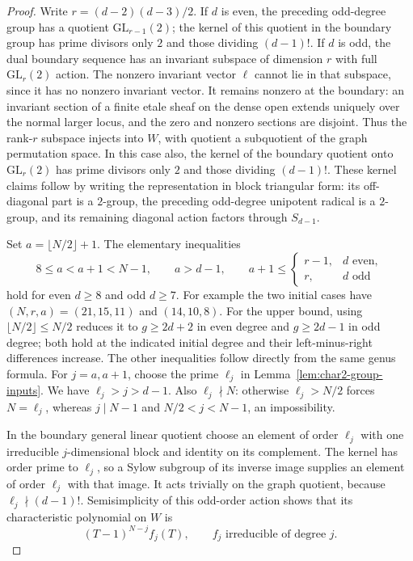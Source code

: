 \begin{proof}
Write $r=(d-2)(d-3)/2$. If $d$ is even, the preceding odd-degree
group has a quotient $\mathrm{GL}_{r-1}(2)$; the kernel of this
quotient in the boundary group has prime divisors only $2$ and
those dividing $(d-1)!$. If $d$ is odd, the dual boundary
sequence has an invariant subspace of dimension $r$ with full
$\mathrm{GL}_r(2)$ action. The nonzero invariant vector $\ell$
cannot lie in that subspace, since it has no nonzero invariant
vector. It remains nonzero at the boundary: an invariant section
of a finite etale sheaf on the dense open extends uniquely over
the normal larger locus, and the zero and nonzero sections are
disjoint. Thus the rank-$r$ subspace injects into $W$, with quotient
a subquotient of the graph permutation space. In this case also,
the kernel of the boundary quotient onto $\mathrm{GL}_r(2)$ has
prime divisors only $2$ and those dividing $(d-1)!$. These kernel
claims follow by writing the representation in block triangular
form: its off-diagonal part is a $2$-group, the preceding odd-degree
unipotent radical is a $2$-group, and its remaining diagonal
action factors through $S_{d-1}$.

Set $a=\lfloor N/2\rfloor+1$. The elementary inequalities
\[
 8\le a<a+1<N-1,\qquad a>d-1,\qquad
 a+1\le\begin{cases}r-1,&d\text{ even},\\r,&d\text{ odd}
 \end{cases}
\]
hold for even $d\ge8$ and odd $d\ge7$. For example the two initial
cases have $(N,r,a)=(21,15,11)$ and $(14,10,8)$.
For the upper bound, using $\lfloor N/2\rfloor\le N/2$
reduces it to $g\ge2d+2$ in even degree and $g\ge2d-1$ in odd
degree; both hold at the indicated initial degree and their
left-minus-right differences increase. The other inequalities
follow directly from the same genus formula.
For $j=a,a+1$, choose the prime $\ell_j$ in
Lemma~\ref{lem:char2-group-inputs}. We have $\ell_j>j>d-1$.
Also $\ell_j\nmid N$: otherwise $\ell_j>N/2$ forces $N=\ell_j$,
whereas $j\mid N-1$ and $N/2<j<N-1$, an impossibility.

In the boundary general linear quotient choose an element of
order $\ell_j$ with one irreducible $j$-dimensional block and
identity on its complement. The kernel has order prime to
$\ell_j$, so a Sylow subgroup of its inverse image supplies an
element of order $\ell_j$ with that image. It acts trivially on
the graph quotient, because $\ell_j\nmid(d-1)!$.
Semisimplicity of this odd-order action shows that its
characteristic polynomial on $W$ is
\[
                    (T-1)^{N-j}f_j(T),
 \qquad f_j\text{ irreducible of degree }j.
\]


\end{proof}
